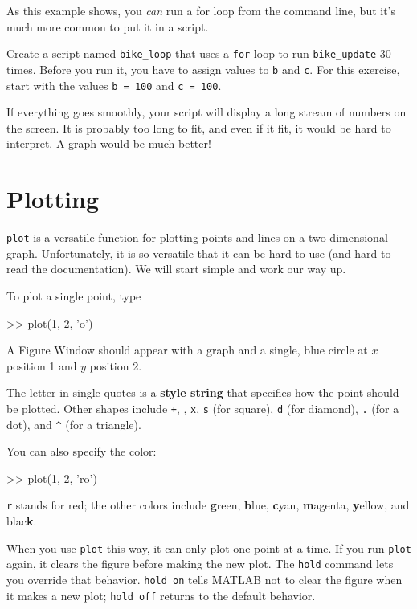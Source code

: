 \documentclass[
]{book}
\numberwithin{Answer}{chapter}
\numberwithin{Exercise}{chapter}
\begin{document}
As this example shows, you {\em can} run a for loop from the
command line, but it's much more common to put it in a script.

\begin{ex}
Create a script named \verb"bike_loop" that uses a {\tt for} loop to run \verb"bike_update" 30 times.  Before you run it, you have to assign values to {\tt b} and {\tt c}.
For this exercise, start with the values {\tt b = 100} and {\tt c = 100}.

If everything goes smoothly, your script will display a long stream
of numbers on the screen.  It is probably too long
to fit, and even if it fit, it would be hard to interpret.
A graph would be much better!
\end{ex}


\section{Plotting}
\label{sect:plotting}


{\tt plot} is a versatile function for plotting points and lines
on a two-dimensional graph.  Unfortunately, it is so versatile
that it can be hard to use (and hard to read the documentation).
We will start simple and work our way up.

To plot a single point, type

\begin{code}
>> plot(1, 2, 'o')
\end{code}

A {\sf Figure Window} should appear with a graph and a single, blue circle
at $x$ position 1 and $y$ position 2.  


The letter in single quotes is a {\bf style string} that specifies how the
point should be plotted.
Other shapes include {\tt +},
{\tt *},
{\tt x},
{\tt s} (for square),
{\tt d} (for diamond), 
{\tt .} (for a dot), and
\verb+^+ (for a triangle).

You can also specify the color:

\begin{code}
>> plot(1, 2, 'ro')
\end{code}

{\tt r} stands for red; the other colors include {\bf g}reen, {\bf
b}lue, {\bf c}yan, {\bf m}agenta, {\bf y}ellow, and blac{\bf k}.

When you use {\tt plot} this way, it can only plot one point at a
time.  If you run {\tt plot} again, it clears the figure before making
the new plot.  The {\tt hold} command lets you override that behavior.
{\tt hold on} tells MATLAB not to clear the figure when it makes a new
plot; {\tt hold off} returns to the default behavior.
\end{document}

